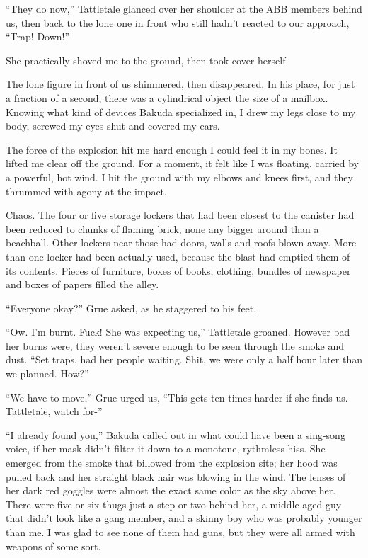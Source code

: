 ``They do now,'' Tattletale glanced over her shoulder at the ABB members behind us, then back to the lone one in front who still hadn't reacted to our approach, ``Trap!  Down!''



She practically shoved me to the ground, then took cover herself.



The lone figure in front of us shimmered, then disappeared.  In his place, for just a fraction of a second, there was a cylindrical object the size of a mailbox.  Knowing what kind of devices Bakuda specialized in, I drew my legs close to my body, screwed my eyes shut and covered my ears.



The force of the explosion hit me hard enough I could feel it in my bones.  It  lifted me clear off the ground.  For a moment, it felt like I was floating, carried by a powerful, hot wind.  I hit the ground with my elbows and knees first, and they thrummed with agony at the impact.



Chaos.  The four or five storage lockers that had been closest to the canister had been  reduced to chunks of flaming brick, none any bigger around than a beachball.  Other lockers near those had doors, walls and roofs blown away.  More than one locker had been actually used, because the blast had emptied them of its contents.  Pieces of furniture, boxes of books, clothing, bundles of newspaper and boxes of papers filled the alley.



``Everyone okay?'' Grue asked, as he staggered to his feet.



``Ow.  I'm burnt.  Fuck!  She was expecting us,'' Tattletale groaned.  However bad her burns were, they weren't severe enough to be seen through the smoke and dust. ``Set traps, had her people waiting.  Shit, we were only a half hour later than we planned.  How?''



``We have to move,'' Grue urged us, ``This gets ten times harder if she finds us.  Tattletale, watch for-''



``I already found you,'' Bakuda called out in what could have been a sing-song voice, if her mask didn't filter it down to a monotone, rythmless hiss.  She emerged from the smoke that billowed from the explosion site; her hood was pulled back and her straight black hair was blowing in the wind.  The lenses of her dark red goggles were almost the exact same color as the sky above her.  There were five or six thugs just a step or two behind her, a middle aged guy that didn't look like a gang member, and a skinny boy who was probably younger than me.  I was glad to see none of them had guns, but they were all armed with weapons of some sort.



